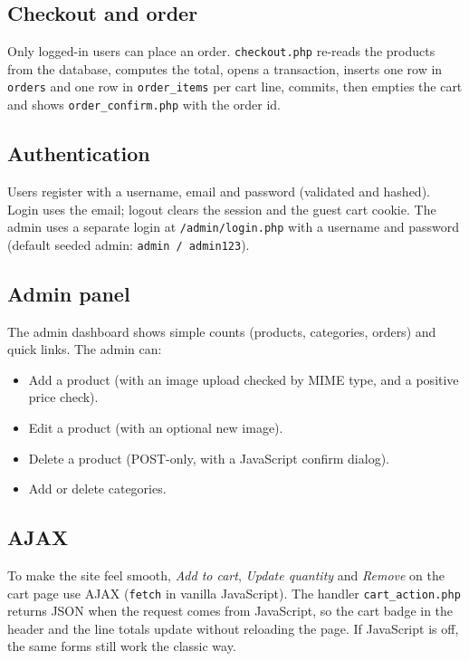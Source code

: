 \documentclass[11pt,a4paper]{article}
\begin{document}
\subsection{Checkout and order}
Only logged-in users can place an order. \texttt{checkout.php} re-reads
the products from the database, computes the total, opens a transaction,
inserts one row in \texttt{orders} and one row in \texttt{order\_items}
per cart line, commits, then empties the cart and shows
\texttt{order\_confirm.php} with the order id.

\subsection{Authentication}
Users register with a username, email and password (validated and
hashed). Login uses the email; logout clears the session and the guest
cart cookie. The admin uses a separate login at \texttt{/admin/login.php}
with a username and password (default seeded admin: \texttt{admin /
admin123}).

\subsection{Admin panel}
The admin dashboard shows simple counts (products, categories, orders)
and quick links. The admin can:
\begin{itemize}
    \item Add a product (with an image upload checked by MIME type, and a
        positive price check).
    \item Edit a product (with an optional new image).
    \item Delete a product (POST-only, with a JavaScript confirm dialog).
    \item Add or delete categories.
\end{itemize}

\subsection{AJAX}
To make the site feel smooth, \emph{Add to cart}, \emph{Update quantity}
and \emph{Remove} on the cart page use AJAX (\texttt{fetch} in vanilla
JavaScript). The handler \texttt{cart\_action.php} returns JSON when the
request comes from JavaScript, so the cart badge in the header and the
line totals update without reloading the page. If JavaScript is off, the
same forms still work the classic way.

\end{document}
